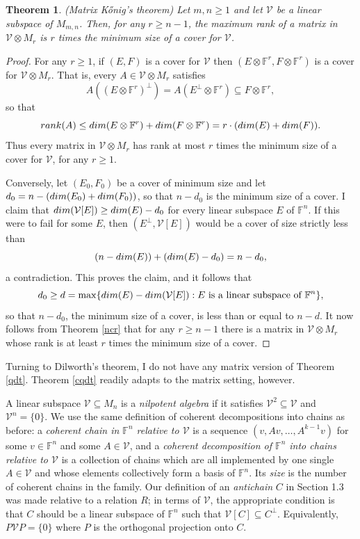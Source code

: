 \documentclass[10pt,a4paper]{amsart}
\newtheorem{thm}{Theorem}[section]
\begin{document}
\begin{thm}\label{mkt} (Matrix Kőnig's theorem)
Let $m,n \geq 1$ and let $\mathcal{V}$ be a linear subspace of $M_{m,n}$. Then, for any $r \geq n - 1$, the maximum rank of a matrix in $\mathcal{V} \otimes M_r$ is $r$ times the minimum size of a cover for $\mathcal{V}$.
\end{thm}

\begin{proof}
For any $r \geq 1$, if $(E,F)$ is a cover for $\mathcal{V}$ then $(E\otimes \mathbb{F}^r, F\otimes \mathbb{F}^r)$ is a cover for $\mathcal{V}\otimes M_r$. That is, every $A \in \mathcal{V}\otimes M_r$ satisfies $$A((E\otimes \mathbb{F}^r)^\perp) = A(E^\perp\otimes \mathbb{F}^r) \subseteq F\otimes \mathbb{F}^r,$$ so that $${\rm rank}(A) \leq {\rm dim}(E\otimes \mathbb{F}^r) + {\rm dim}(F\otimes \mathbb{F}^r) = r\cdot ({\rm dim}(E) + {\rm dim}(F)).$$ Thus every matrix in $\mathcal{V} \otimes M_r$ has rank at most $r$ times the minimum size of a cover for $\mathcal{V}$, for any $r \geq 1$.

Conversely, let $(E_0,F_0)$ be a cover of minimum size and let $d_0 = n - ({\rm dim}(E_0) + {\rm dim}(F_0))$, so that $n - d_0$ is the minimum size of a cover. I claim that ${\rm dim}(\mathcal{V}[E]) \geq {\rm dim}(E) - d_0$ for every linear subspace $E$ of $\mathbb{F}^n$. If this were to fail for some $E$, then $(E^\perp, \mathcal{V}[E])$ would be a cover of size strictly less than $$(n - {\rm dim}(E)) + ({\rm dim}(E) - d_0) = n - d_0,$$ a contradiction. This proves the claim, and it follows that $$d_0 \geq d = \max\{{\rm dim}(E) - {\rm dim}(\mathcal{V}[E]): E\mbox{ is a linear subspace of }\mathbb{F}^n\},$$ so that $n - d_0$, the minimum size of a cover, is less than or equal to $n - d$. It now follows from Theorem \ref{ncr} that for any $r \geq n - 1$ there is a matrix in $\mathcal{V} \otimes M_r$ whose rank is at least $r$ times the minimum size of a cover.
\end{proof}

Turning to Dilworth's theorem, I do not have any matrix version of Theorem \ref{qdt}. Theorem \ref{cqdt} readily adapts to the matrix setting, however. 

A linear subspace $\mathcal{V} \subseteq M_n$ is a {\it nilpotent algebra} if it satisfies $\mathcal{V}^2 \subseteq \mathcal{V}$ and $\mathcal{V}^n = \{0\}$. We use the same definition of coherent decompositions into chains as before: a {\it coherent chain in $\mathbb{F}^n$ relative to $\mathcal{V}$} is a sequence $(v, Av, \ldots, A^{k-1}v)$ for some $v \in \mathbb{F}^n$ and some $A \in \mathcal{V}$, and a {\it coherent decomposition of $\mathbb{F}^n$ into chains relative to $\mathcal{V}$} is a collection of chains which are all implemented by one single $A \in \mathcal{V}$ and whose elements collectively form a basis of $\mathbb{F}^n$. Its {\it size} is the number of coherent chains in the family. Our definition of an {\it antichain} $C$ in Section 1.3 was made relative to a relation $R$; in terms of $\mathcal{V}$, the appropriate condition is that $C$ should be a linear subspace of $\mathbb{F}^n$ such that $\mathcal{V}[C] \subseteq C^\perp$. Equivalently, $P\mathcal{V}P = \{0\}$ where $P$ is the orthogonal projection onto $C$.
\end{document}
